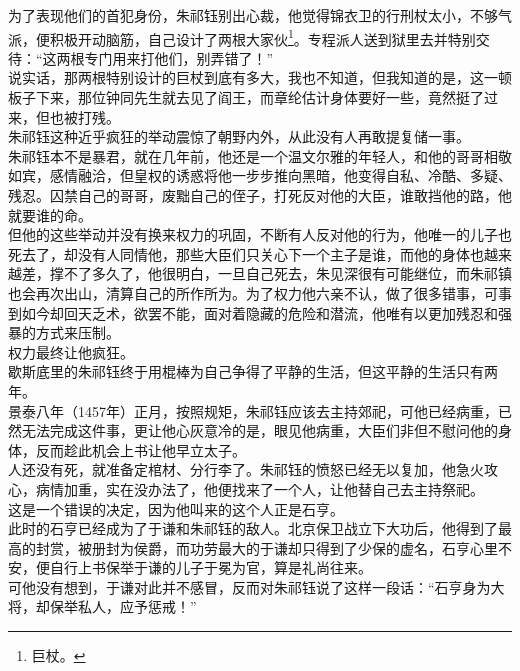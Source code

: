 \begin{multicols}{\theparacolNo}
为了表现他们的首犯身份，朱祁钰别出心裁，他觉得锦衣卫的行刑杖太小，不够气派，便积极开动脑筋，自己设计了两根大家伙\footnote{巨杖。}。专程派人送到狱里去并特别交待：“这两根专门用来打他们，别弄错了！”\\

说实话，那两根特别设计的巨杖到底有多大，我也不知道，但我知道的是，这一顿板子下来，那位钟同先生就去见了阎王，而章纶估计身体要好一些，竟然挺了过来，但也被打残。\\

朱祁钰这种近乎疯狂的举动震惊了朝野内外，从此没有人再敢提复储一事。\\

朱祁钰本不是暴君，就在几年前，他还是一个温文尔雅的年轻人，和他的哥哥相敬如宾，感情融洽，但皇权的诱惑将他一步步推向黑暗，他变得自私、冷酷、多疑、残忍。囚禁自己的哥哥，废黜自己的侄子，打死反对他的大臣，谁敢挡他的路，他就要谁的命。\\

但他的这些举动并没有换来权力的巩固，不断有人反对他的行为，他唯一的儿子也死去了，却没有人同情他，那些大臣们只关心下一个主子是谁，而他的身体也越来越差，撑不了多久了，他很明白，一旦自己死去，朱见深很有可能继位，而朱祁镇也会再次出山，清算自己的所作所为。为了权力他六亲不认，做了很多错事，可事到如今却回天乏术，欲罢不能，面对着隐藏的危险和潜流，他唯有以更加残忍和强暴的方式来压制。\\

权力最终让他疯狂。\\

歇斯底里的朱祁钰终于用棍棒为自己争得了平静的生活，但这平静的生活只有两年。\\

景泰八年（1457年）正月，按照规矩，朱祁钰应该去主持郊祀，可他已经病重，已然无法完成这件事，更让他心灰意冷的是，眼见他病重，大臣们非但不慰问他的身体，反而趁此机会上书让他早立太子。\\

人还没有死，就准备定棺材、分行李了。朱祁钰的愤怒已经无以复加，他急火攻心，病情加重，实在没办法了，他便找来了一个人，让他替自己去主持祭祀。\\

这是一个错误的决定，因为他叫来的这个人正是石亨。\\

此时的石亨已经成为了于谦和朱祁钰的敌人。北京保卫战立下大功后，他得到了最高的封赏，被册封为侯爵，而功劳最大的于谦却只得到了少保的虚名，石亨心里不安，便自行上书保举于谦的儿子于冕为官，算是礼尚往来。\\

可他没有想到，于谦对此并不感冒，反而对朱祁钰说了这样一段话：“石亨身为大将，却保举私人，应予惩戒！”\\


\end{multicols}
